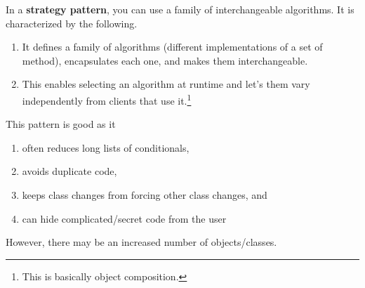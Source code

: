     \begin{definition}
      \label{def:strategy-pattern}
 
      In a \textbf{strategy pattern}, you can use a family of interchangeable algorithms. It is characterized by the following. 
      \begin{enumerate}
        \item It defines a family of algorithms (different implementations of a set of method), encapsulates each one, and makes them interchangeable. 
        \item This enables selecting an algorithm at runtime and let's them vary independently from clients that use it.\footnote{This is basically object composition. }
      \end{enumerate}
    \end{definition} 

    This pattern is good as it 
    \begin{enumerate}
      \item often reduces long lists of conditionals, 
      \item avoids duplicate code, 
      \item keeps class changes from forcing other class changes, and 
      \item can hide complicated/secret code from the user
    \end{enumerate}

    However, there may be an increased number of objects/classes. 

